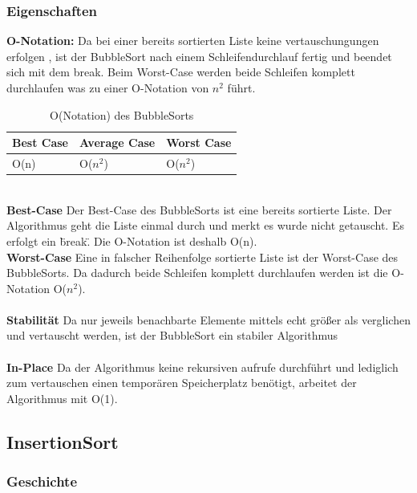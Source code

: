 \documentclass{article}
\begin{document}
\subsubsection{Eigenschaften}
\textbf{O-Notation:} Da bei einer bereits sortierten Liste keine vertauschungungen erfolgen , ist der BubbleSort nach einem Schleifendurchlauf fertig und beendet sich mit dem break. Beim Worst-Case werden beide Schleifen komplett durchlaufen was zu einer O-Notation von $n^{2}$ führt.
\begin{table}[h]
\centering
\begin{tabular}{lll}
	\hline
	\textbf{Best Case} & \textbf{Average Case} & \textbf{Worst Case} \\
	\hline
	O(n) & O($n^{2}$) & O($n^{2}$) \\
	\hline
\end{tabular}
\caption{O(Notation) des BubbleSorts \cite{India2015Dataset}}
\label{tab:bubbleSort}
\end{table}
\\\textbf{Best-Case} Der Best-Case des BubbleSorts ist eine bereits sortierte Liste. Der Algorithmus geht die Liste einmal durch und merkt es wurde nicht getauscht. Es erfolgt ein \"break\". Die O-Notation ist deshalb O(n).\\
\textbf{Worst-Case} Eine in falscher Reihenfolge sortierte Liste ist der Worst-Case des BubbleSorts. Da dadurch beide Schleifen komplett durchlaufen werden ist die O-Notation O($n^{2}$). \\ \\
\textbf{Stabilität} Da nur jeweils benachbarte Elemente mittels echt größer als verglichen und vertauscht werden, ist der BubbleSort ein stabiler Algorithmus \\ \\
\textbf{In-Place} Da der Algorithmus keine rekursiven aufrufe durchführt und lediglich zum vertauschen einen temporären Speicherplatz benötigt, arbeitet der Algorithmus mit O(1). \\





\subsection{InsertionSort}
\subsubsection{Geschichte}
\end{document}
